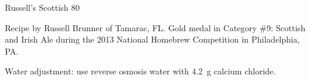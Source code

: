 \begin{recipe}{Russell's Scottish 80}

\begin{aboutblock}
Recipe by Russell Brunner of Tamarac, FL. Gold medal in Category \#9: Scottish
and Irish Ale during the 2013 National Homebrew Competition in Philadelphia, PA.
\sourceaha
\end{aboutblock}


\begin{methodandtiming}

\begin{mashsteps}
\end{mashsteps}

\begin{fermentationsteps}
\end{fermentationsteps}

\begin{directions}
Water adjustment: use reverse osmosis water with 4.2~g calcium chloride.
\end{directions}

\end{methodandtiming}

\recipebreak

\begin{ingredientsblock}

\begin{malts}
\end{malts}

\begin{hops}
\end{hops}


\end{ingredientsblock}

\end{recipe}
